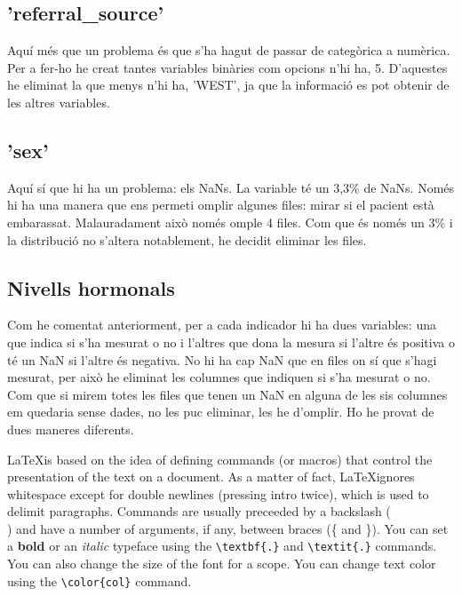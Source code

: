 \documentclass[9pt,a4paper,twoside]{tau-class/tau}
\begin{document}
    \subsection{'referral\_source'}
    Aquí més que un problema és que s'ha hagut de passar de categòrica a numèrica. Per a fer-ho he creat tantes variables binàries com opcions n'hi ha, 5. D'aquestes he eliminat la que menys n'hi ha, 'WEST', ja que la informació es pot obtenir de les altres variables.

    \subsection{'sex'}
    Aquí sí que hi ha un problema: els NaNs. La variable té un 3,3\% de NaNs. Només hi ha una manera que ens permeti omplir algunes files: mirar si el pacient està embarassat. Malauradament això només omple 4 files. Com que és només un 3\% i la distribució no s'altera notablement, he decidit eliminar les files.

    \subsection{Nivells hormonals}
    Com he comentat anteriorment, per a cada indicador hi ha dues variables: una que indica si s'ha mesurat o no i l'altres que dona la mesura si l'altre és positiva o té un NaN si l'altre és negativa. No hi ha cap NaN que en files on sí que s'hagi mesurat, per això he eliminat les columnes que indiquen si s'ha mesurat o no. Com que si mirem totes les files que tenen un NaN en alguna de les sis columnes em quedaria sense dades, no les puc eliminar, les he d'omplir. Ho he provat de dues maneres diferents.

    


    \LaTeX is based on the idea of defining commands (or macros) that control the presentation of the text on a document. As a matter of fact, \LaTeX ignores whitespace except for double newlines (pressing intro twice), which is used to delimit paragraphs. Commands are usually preceeded by a backslash (\\) and have a number of arguments, if any, between braces (\{ and \}). You can set a \textbf{bold} or an \textit{italic} typeface using the \verb|\textbf{.}| and \verb|\textit{.}| commands. You can also {\tiny change the size of the font for a scope}. You can change {\color{red} text color} using the \verb|\color{col}| command. 
\end{document}
